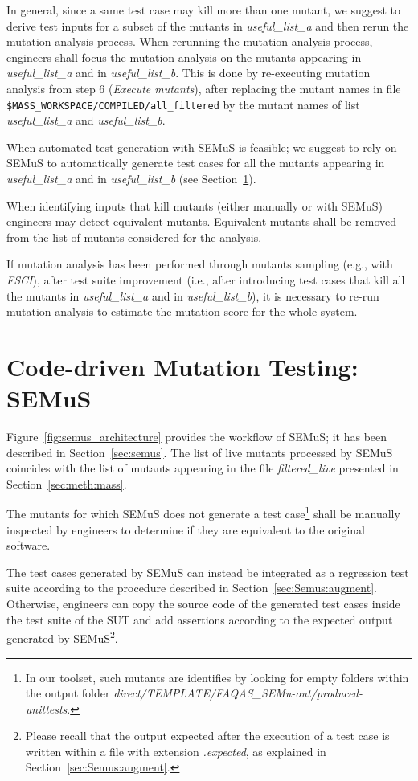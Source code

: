 In general, since a same test case may kill more than one mutant, we suggest to derive test inputs for a subset of the mutants in \emph{useful\_list\_a} and then rerun the mutation analysis process. When rerunning the mutation analysis process, engineers shall focus the mutation analysis on the mutants appearing in \emph{useful\_list\_a} and in \emph{useful\_list\_b}. This is done by re-executing mutation analysis from step 6 (\emph{Execute mutants}), after replacing the mutant names in file \texttt{\$MASS\_WORKSPACE/COMPILED/all\_filtered} by the mutant names of list \emph{useful\_list\_a} and \emph{useful\_list\_b}.

When automated test generation with SEMuS is feasible; we suggest to rely on SEMuS to automatically generate test cases for all the mutants appearing in \emph{useful\_list\_a} and in \emph{useful\_list\_b} (see Section~\ref{sec:meth:semus}). 

When identifying inputs that kill mutants (either manually or with SEMuS) engineers may detect equivalent mutants. Equivalent mutants shall be removed from the list of mutants considered for the analysis.

If mutation analysis has been performed through mutants sampling (e.g., with \emph{FSCI}), after test suite improvement (i.e., after introducing test cases that kill all the mutants in \emph{useful\_list\_a} and in \emph{useful\_list\_b}), it is necessary to re-run mutation analysis to estimate the mutation score for the whole system.

\clearpage
\section{Code-driven Mutation Testing: SEMuS}
\label{sec:meth:semus}

Figure~\ref{fig:semus_architecture} provides the workflow of SEMuS; it has been described in Section~\ref{sec:semus}. The list of live mutants processed by SEMuS coincides with the list of mutants appearing in the file \emph{filtered\_live} presented in Section~\ref{sec:meth:mass}. 

The mutants for which SEMuS does not generate a test case\footnote{In our toolset, such mutants are identifies by looking for empty folders within the output folder \emph{direct/TEMPLATE/FAQAS\_SEMu-out/produced-unittests}.} shall be manually inspected by engineers to determine if they are equivalent to the original software.

The test cases generated by SEMuS can instead be integrated as a regression test suite according to the  procedure described in Section~\ref{sec:Semus:augment}. Otherwise, engineers can copy the source code of the generated test cases inside the test suite of the SUT and add assertions according to the expected output generated by SEMuS\footnote{Please recall that the output expected after the execution of a test case is written within a file with extension \emph{.expected}, as explained in Section~\ref{sec:Semus:augment}.}.

